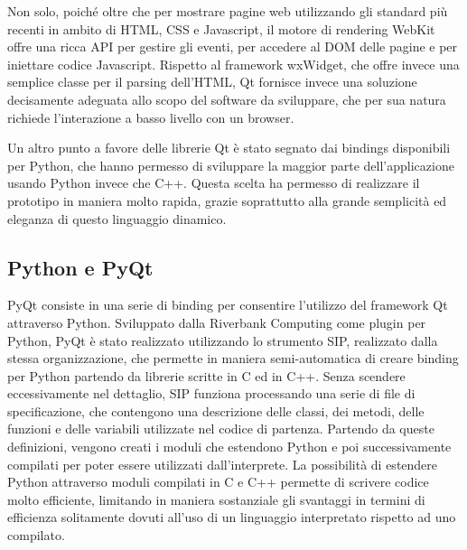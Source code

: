 \documentclass[12pt]{toptesi}
\begin{document}
Non solo, poiché oltre che per mostrare pagine web utilizzando gli standard più recenti in ambito di HTML, CSS e Javascript, il motore di rendering WebKit offre una ricca API per gestire gli eventi, per accedere al DOM delle pagine e per iniettare codice Javascript. Rispetto al framework wxWidget, che offre invece una semplice classe per il parsing dell'HTML, Qt  fornisce invece una soluzione decisamente adeguata allo scopo del software da sviluppare, che per sua natura richiede l'interazione a basso livello con un browser.

Un altro punto a favore delle librerie Qt è stato segnato dai bindings disponibili per Python, che hanno permesso di sviluppare la maggior parte dell'applicazione usando Python invece che C++. Questa scelta ha permesso di realizzare il prototipo in maniera molto rapida, grazie soprattutto alla grande semplicità ed eleganza di questo linguaggio dinamico.

\subsection{Python e PyQt}

PyQt consiste in una serie di binding per consentire l'utilizzo del framework Qt attraverso Python. Sviluppato dalla Riverbank Computing come plugin per Python, PyQt è stato realizzato utilizzando lo strumento SIP, realizzato dalla stessa organizzazione, che permette in maniera semi-automatica di creare binding per Python partendo da librerie scritte in C ed in C++. Senza scendere eccessivamente nel dettaglio, SIP funziona processando una serie di file di specificazione, che contengono una descrizione delle classi, dei metodi, delle funzioni e delle variabili utilizzate nel codice di partenza. Partendo da queste definizioni, vengono creati i moduli che estendono Python e poi successivamente compilati per poter essere utilizzati dall'interprete. La possibilità di estendere Python attraverso moduli compilati in C e C++ permette di scrivere codice molto efficiente, limitando in maniera sostanziale gli svantaggi in termini di efficienza solitamente dovuti all'uso di un linguaggio interpretato rispetto ad uno compilato.
\end{document}
